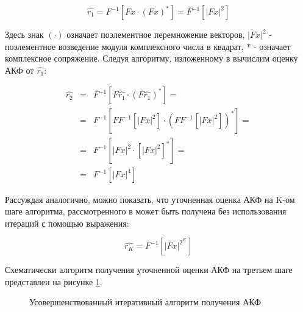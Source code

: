 \begin{center}
\begin{equation}
	\label{eq:akf_1}
	\hat{r_1} = F^{-1}\left[ Fx \cdot (Fx)^* \right] = F^{-1} \left[ \left| Fx \right| ^2 \right]
\end{equation}
\end{center}

Здесь знак ${(\cdot)}$  означает поэлементное перемножение векторов, ${\left| Fx \right| ^2}$ - поэлементное возведение модуля комплексного числа в квадрат, ${*}$ - означает
комплексное сопряжение.  Следуя алгоритму, изложенному в \cite{ostanin_akf} вычислим оценку АКФ от ${\hat{r_1}}$:

\begin{center}
\begin{eqnarray}
	\label{eq:akf_2}
	\hat{r_2} & = & F^{-1}\left[ F \hat{r_1} \cdot (F \hat{r_1})^* \right] = \nonumber \\
		& = & F^{-1}	\left[ 
				FF^{-1} \left[
						\left| Fx \right| ^2
					\right]
						\cdot \left( FF^{-1} \left[ \left| Fx \right| ^2 \right]
					\right) ^*
			\right] = \nonumber \\
		& = & F^{-1} \left[ \left| Fx \right| ^2 \cdot \left[ \left| Fx \right| ^2 \right] ^* \right] =  \nonumber \\
		& = & F^{-1} \left[ \left| Fx \right| ^4 \right]
\end{eqnarray}
\end{center}

Рассуждая аналогично, можно показать, что уточненная оценка АКФ на K-ом шаге алгоритма, рассмотренного в \cite{ostanin_akf}
может быть получена без использования итераций с помощью выражения:

\begin{center}
\begin{equation}
	\label{eq:akf_3}
	\hat{r_K} = F^{-1}\left[ \left| Fx \right| ^{2^K} \right]
\end{equation}
\end{center}

Схематически алгоритм получения уточненной оценки АКФ на третьем шаге представлен на рисунке \ref{pic:akf_pic}.

\begin{figure}[H]
	\center{}
	\caption{Усовершенствованный итеративный алгоритм получения АКФ}
	\label{pic:akf_pic}
\end{figure}

\newpage
